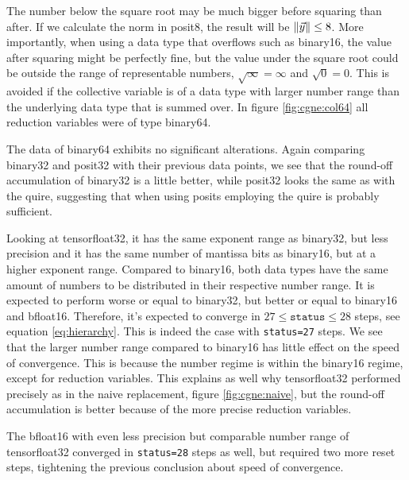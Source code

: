 \documentclass{article}
\theoremstyle{plain} %
\theoremstyle{convention} %
\theoremstyle{remark} %
\def\code#1{\texttt{#1}}
\numberwithin{equation}{section}
\begin{document}
The number below the square root may be much bigger before squaring than after. If we calculate the norm in \gls{posit8}, the result will be $\norm{\vec{y}} \leq 8$. More importantly, when using a data type that overflows such as \gls{binary16}, the value after squaring might be perfectly fine, but the value under the square root could be outside the range of representable numbers, $\sqrt{\infty} = \infty$ and $\sqrt{0} = 0$. This is avoided if the collective variable is of a data type with larger number range than the underlying data type that is summed over. In figure \ref{fig:cgne:col64} all reduction variables were of type \gls{binary64}.

The data of \gls{binary64} exhibits no significant alterations. Again comparing \gls{binary32} and \gls{posit32} with their previous data points, we see that the round-off accumulation of \gls{binary32} is a little better, while \gls{posit32} looks the same as with the \gls{quire}, suggesting that when using posits employing the \gls{quire} is probably sufficient.

Looking at \gls{tensorfloat32}, it has the same exponent range as \gls{binary32}, but less precision and it has the same number of mantissa bits as \gls{binary16}, but at a higher exponent range. Compared to \gls{binary16}, both data types have the same amount of numbers to be distributed in their respective number range. It is expected to perform worse or equal to \gls{binary32}, but better or equal to \gls{binary16} and \gls{bfloat16}. Therefore, it's expected to converge in $27 \le \code{status} \le 28$ steps, see equation \eqref{eq:hierarchy}. This is indeed the case with \code{status=27} steps. We see that the larger number range compared to \gls{binary16} has little effect on the speed of convergence. This is because the number regime is within the \gls{binary16} regime, except for reduction variables. This explains as well why \gls{tensorfloat32} performed precisely as in the naive replacement, figure \ref{fig:cgne:naive}, but the round-off accumulation is better because of the more precise reduction variables.

The \gls{bfloat16} with even less precision but comparable number range of \gls{tensorfloat32} converged in \code{status=28} steps as well, but required two more reset steps, tightening the previous conclusion about speed of convergence.
\end{document}
